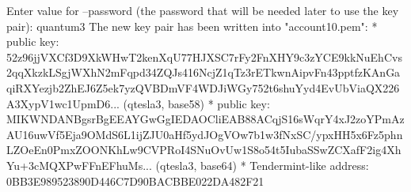 \begin{shellbox}\begin{ttlst}
Enter value for --password (the password that will be needed later to use the key pair): quantum3
The new key pair has been written into "account10.pem":
* public key: 52z96jjVXCf3D9XkWHwT2kenXqU77HJXSC7rFy2FnXHY9c3zYCE9kkNuEhCvs2qqXkzkLSgjWXhN2mFqpd34ZQJs416NcjZ1qTz3rETkwnAipvFn43pptfzKAnGaqiRXYezjb2ZhEJ6Z5ek7yzQVBDmVF4WDJiWGy752t6shuYyd4EvUbViaQX226A3XypV1wc1UpmD6... (qtesla3, base58)
* public key: MIKWNDANBgsrBgEEAYGwGgIEDAOCliEAB88ACqjS16sWqrY4xJ2zoYPmAzAU16uwVf5Eja9OMdS6L1ijZJU0aHf5ydJOgVOw7b1w3fNxSC/ypxHH5x6Fz5phnLZOeEn0PmxZOONKhLw9CVPRoI4SNuOvUw1S8o54t5IubaSSwZCXafF2ig4XhYu+3cMQXPwFFnEFhuMs... (qtesla3, base64)
* Tendermint-like address: 0BB3E989523890D446C7D90BACBBE022DA482F21
\end{ttlst}\end{shellbox}
